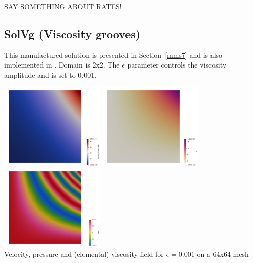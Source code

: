 SAY SOMETHING ABOUT RATES!

\newpage
\subsection*{SolVg (Viscosity grooves)}

This manufactured solution is presented in Section~\ref{mms7} and is also implemented in \aspect.
Domain is 2x2. The $\epsilon$ parameter controls the viscosity amplitude and is set to 0.001.

\begin{center}
\includegraphics[width=5cm]{python_codes/fieldstone_112/results/exp6/vel}
\includegraphics[width=5cm]{python_codes/fieldstone_112/results/exp6/press}
\includegraphics[width=5cm]{python_codes/fieldstone_112/results/exp6/eta}\\
{\captionfont Velocity, pressure and (elemental) viscosity field for $\epsilon=0.001$ on a 64x64 mesh}
\end{center}


